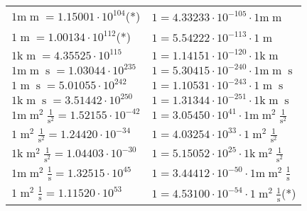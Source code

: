 \begin{center}
\begin{longtable}{l l}
{\color{gray}$1 \bm{\mathrm{ m}}{\operatorname{m}}{}{}{} = 1.15001\cdot10^{104} $}\quad(*) & {\color{gray}$ 1 = 4.33233\cdot10^{-105} \cdot 1 \bm{\mathrm{ m}}{\operatorname{m}}{}{}{}$}  \\
{\color{black}$1 \bm{\mathrm{ }}{\operatorname{m}}{}{}{} = 1.00134\cdot10^{112} $}\quad(*) & {\color{black}$ 1 = 5.54222\cdot10^{-113} \cdot 1 \bm{\mathrm{ }}{\operatorname{m}}{}{}{}$}  \\
{\color{gray}$1 \bm{\mathrm{ k}}{\operatorname{m}}{}{}{} = 4.35525\cdot10^{115} $}   & {\color{gray}$ 1 = 1.14151\cdot10^{-120} \cdot 1 \bm{\mathrm{ k}}{\operatorname{m}}{}{}{}$}  \\
{\color{gray}$1 \bm{\mathrm{ m}}{\operatorname{m}}{\operatorname{s}}{}{} = 1.03044\cdot10^{235} $}   & {\color{gray}$ 1 = 5.30415\cdot10^{-240} \cdot 1 \bm{\mathrm{ m}}{\operatorname{m}}{\operatorname{s}}{}{}$}  \\
{\color{black}$1 \bm{\mathrm{ }}{\operatorname{m}}{\operatorname{s}}{}{} = 5.01055\cdot10^{242} $}   & {\color{black}$ 1 = 1.10531\cdot10^{-243} \cdot 1 \bm{\mathrm{ }}{\operatorname{m}}{\operatorname{s}}{}{}$}  \\
{\color{gray}$1 \bm{\mathrm{ k}}{\operatorname{m}}{\operatorname{s}}{}{} = 3.51442\cdot10^{250} $}   & {\color{gray}$ 1 = 1.31344\cdot10^{-251} \cdot 1 \bm{\mathrm{ k}}{\operatorname{m}}{\operatorname{s}}{}{}$}  \\
{\color{gray}$1 \bm{\mathrm{ m}}{\operatorname{m}^2}\frac1{\operatorname{s}^2}{}{} = 1.52155\cdot10^{-42} $}   & {\color{gray}$ 1 = 3.05450\cdot10^{41} \cdot 1 \bm{\mathrm{ m}}{\operatorname{m}^2}\frac1{\operatorname{s}^2}{}{}$}  \\
{\color{black}$1 \bm{\mathrm{ }}{\operatorname{m}^2}\frac1{\operatorname{s}^2}{}{} = 1.24420\cdot10^{-34} $}   & {\color{black}$ 1 = 4.03254\cdot10^{33} \cdot 1 \bm{\mathrm{ }}{\operatorname{m}^2}\frac1{\operatorname{s}^2}{}{}$}  \\
{\color{gray}$1 \bm{\mathrm{ k}}{\operatorname{m}^2}\frac1{\operatorname{s}^2}{}{} = 1.04403\cdot10^{-30} $}   & {\color{gray}$ 1 = 5.15052\cdot10^{25} \cdot 1 \bm{\mathrm{ k}}{\operatorname{m}^2}\frac1{\operatorname{s}^2}{}{}$}  \\
{\color{gray}$1 \bm{\mathrm{ m}}{\operatorname{m}^2}\frac1{\operatorname{s}}{}{} = 1.32515\cdot10^{45} $}   & {\color{gray}$ 1 = 3.44412\cdot10^{-50} \cdot 1 \bm{\mathrm{ m}}{\operatorname{m}^2}\frac1{\operatorname{s}}{}{}$}  \\
{\color{black}$1 \bm{\mathrm{ }}{\operatorname{m}^2}\frac1{\operatorname{s}}{}{} = 1.11520\cdot10^{53} $}   & {\color{black}$ 1 = 4.53100\cdot10^{-54} \cdot 1 \bm{\mathrm{ }}{\operatorname{m}^2}\frac1{\operatorname{s}}{}{}$}\quad(*)\\

\end{longtable}
\end{center}
